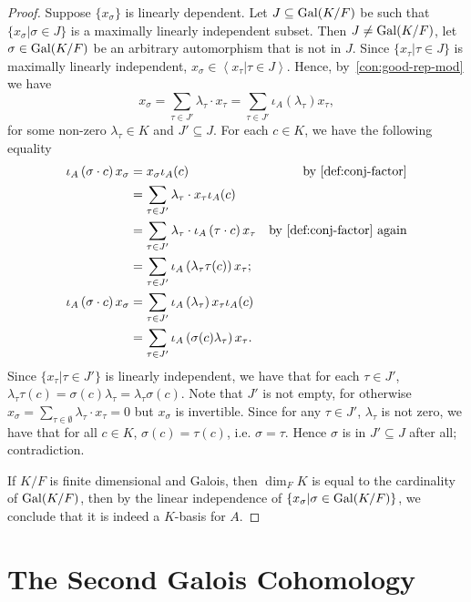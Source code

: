 \begin{proof}
  Suppose $\{x_{\sigma}\}$ is linearly dependent. Let $J \subseteq \operatorname{Gal}(K/F)$ be such that $\{x_{\sigma}|\sigma\in J\}$ is a maximally linearly independent subset.
  Then $J \ne \operatorname{Gal}(K/F)$, let $\sigma \in\operatorname{Gal}(K/F)$ be an arbitrary automorphism that is not in $J$. Since $\{x_{\tau}|\tau\in J\}$ is maximally linearly independent, $x_\sigma \in \left\langle x_{\tau}|\tau\in J\right\rangle$. Hence, by~\cref{con:good-rep-mod} we have
  \[
    x_\sigma = \sum_{\tau\in J'}\lambda_{\tau}\cdot x_{\tau} = \sum_{\tau\in J'}\iota_{A}\left(\lambda_{\tau}\right)x_{\tau},
  \]
  for some non-zero $\lambda_{\tau}\in K$ and $J' \subseteq J$.
  For each $c \in K$, we have the following equality
  \[
    \begin{aligned}
      \iota_{A}\left(\sigma \cdot c\right) x_{\sigma}
      &= x_{\sigma} \iota_{A}(c) &\text{by~\cref{def:conj-factor}}\\
      &= \sum_{\tau\in J'}\lambda_{\tau}\cdot x_{\tau}\iota_{A}(c) & \\
      &= \sum_{\tau\in J'}\lambda_{\tau}\cdot \iota_{A}\left(\tau\cdot c\right)x_{\tau} &\text{by~\cref{def:conj-factor} again}\\
      &=\sum_{\tau\in J'}\iota_{A}\left(\lambda_{\tau}\tau(c)\right)x_{\tau};\\
      \iota_{A}\left(\sigma\cdot c\right)x_{\sigma}
      &= \sum_{\tau\in J'}\iota_{A}\left(\lambda_{\tau}\right) x_{\tau}\iota_{A}(c)\\
      &= \sum_{\tau\in J'}\iota_{A}\left(\sigma(c)\lambda_{\tau}\right)x_{\tau}.
    \end{aligned}
  \]
  Since $\{x_{\tau}|\tau\in J'\}$ is linearly independent, we have that for each $\tau \in J'$, $\lambda_{\tau}\tau(c) = \sigma(c)\lambda_{\tau} = \lambda_{\tau}\sigma(c)$. Note that $J'$ is not empty, for otherwise $x_{\sigma}=\sum_{\tau\in\emptyset}\lambda_{\tau}\cdot x_{\tau}=0$ but $x_{\sigma}$ is invertible. Since for any $\tau\in J'$, $\lambda_{\tau}$ is not zero, we have that for all $c \in K$, $\sigma(c) = \tau(c)$, i.e. $\sigma = \tau$. Hence $\sigma$ is in $J' \subseteq J$ after all; contradiction.

  If $K/F$ is finite dimensional and Galois, then $\dim_{F}K$ is equal to the cardinality of $\operatorname{Gal}(K/F)$, then by the linear independence of $\{x_{\sigma}|\sigma\in\operatorname{Gal}(K/F)\}$, we conclude that it is indeed a $K$-basis for $A$.
\end{proof}

\section{The Second Galois Cohomology}

